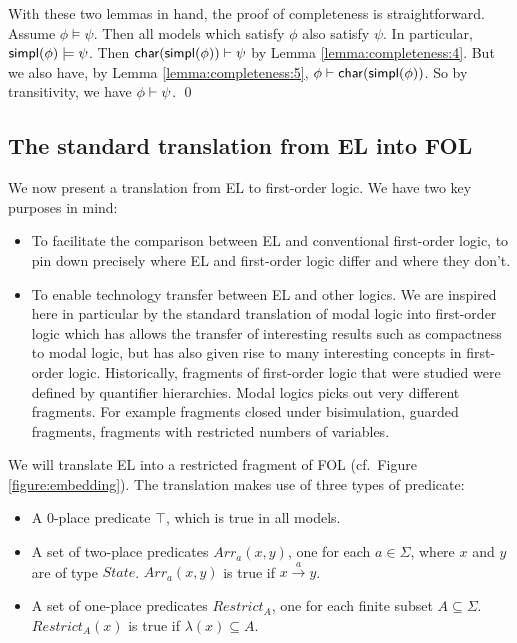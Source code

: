With these two lemmas in hand, the proof of completeness is
straightforward.  Assume $\phi \models \psi$.  Then all models which satisfy
$\phi$ also satisfy $\psi$.  In particular, $\mathsf{simpl}(\phi) \models \psi$.  Then
$\mathsf{char}(\mathsf{simpl}(\phi)) \vdash \psi$ by Lemma \ref{lemma:completeness:4}.  But we
also have, by Lemma \ref{lemma:completeness:5}, $\phi \vdash
\mathsf{char}(\mathsf{simpl}(\phi)) $.  So by transitivity, we have $\phi \vdash \psi$.  \qed


\subsection{The standard translation from  EL into FOL}\label{standardTranslation}

We now present a translation from EL to first-order logic. We have two
key purposes in mind:

\begin{itemize}

\item To facilitate the comparison between EL and conventional
  first-order logic, to pin down precisely where EL and first-order
  logic differ and where they don't.

\item To enable technology transfer between EL and other logics. We
  are inspired here in particular by the standard translation of modal
  logic into first-order logic \cite{BlackburnP:modlog} which has
  allows the transfer of interesting results such as compactness to
  modal logic, but has also given rise to many interesting concepts in
  first-order logic.  Historically, fragments of first-order logic
  that were studied were defined by quantifier hierarchies. Modal
  logics picks out very different fragments. For example fragments
  closed under bisimulation, guarded fragments, fragments with
  restricted numbers of variables.

\end{itemize}



\NI We will translate EL into a restricted fragment of FOL  (cf.~Figure
\ref{figure:embedding}). The translation makes use of three types of
predicate:

\begin{itemize}

\item A 0-place predicate $\top$, which is true in all models.

\item A set of two-place predicates $Arr_a(x, y)$, one for each $a \in
  \Sigma$, where $x$ and $y$ are of type $State$. $Arr_a(x, y)$
  is true if $x \xrightarrow{a} y$.

\item A set of one-place predicates $Restrict_A$, one for each finite
  subset $A \subseteq \Sigma$.  $Restrict_{A}(x)$ is true if
  $\lambda(x) \subseteq A$.

\end{itemize}

